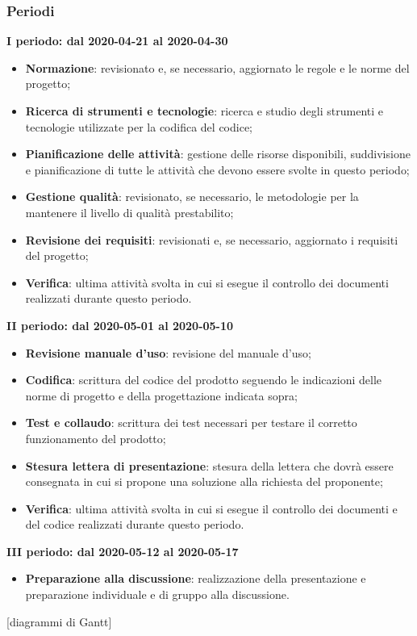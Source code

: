 \subsubsection{Periodi}
\textbf{I periodo: dal 2020-04-21 al 2020-04-30}
\begin{itemize}
	\item \textbf{Normazione}: revisionato e, se necessario, aggiornato le regole e le norme del progetto;
	\item \textbf{Ricerca di strumenti e tecnologie}: ricerca e studio degli strumenti e tecnologie utilizzate per la codifica del codice;
	\item \textbf{Pianificazione delle attività}: gestione delle risorse disponibili, suddivisione e pianificazione di tutte le attività che devono essere svolte in questo periodo;
	\item \textbf{Gestione qualità}: revisionato, se necessario, le metodologie per la mantenere il livello di qualità prestabilito;
	\item \textbf{Revisione dei requisiti}: revisionati e, se necessario, aggiornato i requisiti del progetto;
	\item \textbf{Verifica}: ultima attività svolta in cui si esegue il controllo dei documenti realizzati durante questo periodo.
\end{itemize}

\textbf{II periodo: dal 2020-05-01 al 2020-05-10}
\begin{itemize}
	\item \textbf{Revisione manuale d'uso}: revisione del manuale d'uso;
	\item \textbf{Codifica}: scrittura del codice del prodotto seguendo le indicazioni delle norme di progetto e della progettazione indicata sopra;
	\item \textbf{Test e collaudo}: scrittura dei test necessari per testare il corretto funzionamento del prodotto;
	\item \textbf{Stesura lettera di presentazione}: stesura della lettera che dovrà essere consegnata in cui si propone una soluzione alla richiesta del proponente;
	\item \textbf{Verifica}: ultima attività svolta in cui si esegue il controllo dei documenti e del codice realizzati durante questo periodo.
\end{itemize}

\textbf{III periodo: dal 2020-05-12 al 2020-05-17}
\begin{itemize}
	\item \textbf{Preparazione alla discussione}: realizzazione della presentazione e preparazione individuale e di gruppo alla discussione.
\end{itemize}

[diagrammi di Gantt]



